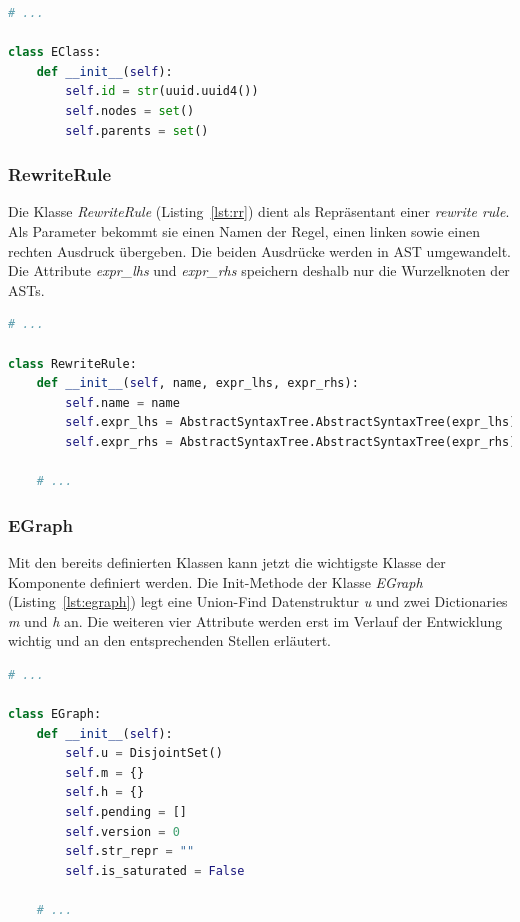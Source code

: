 \begin{lstlisting}[language=Python, caption=Klasse \textit{EClass}, label={lst:eclass}]
# ... 

class EClass:
    def __init__(self):
        self.id = str(uuid.uuid4())
        self.nodes = set()
        self.parents = set()
\end{lstlisting}

\subsubsection{RewriteRule}

Die Klasse \textit{RewriteRule} (Listing~\ref{lst:rr}) dient als Repräsentant einer \textit{rewrite rule}. Als Parameter bekommt sie einen Namen der Regel, einen linken sowie einen 
rechten Ausdruck übergeben. Die beiden Ausdrücke werden in AST umgewandelt. Die Attribute \textit{expr\_lhs} und \textit{expr\_rhs} speichern deshalb nur die Wurzelknoten der ASTs.

\begin{lstlisting}[language=Python, caption=Klasse \textit{RewriteRule}, label={lst:rr}]
# ... 

class RewriteRule:
    def __init__(self, name, expr_lhs, expr_rhs):
        self.name = name
        self.expr_lhs = AbstractSyntaxTree.AbstractSyntaxTree(expr_lhs)
        self.expr_rhs = AbstractSyntaxTree.AbstractSyntaxTree(expr_rhs)

    # ... 
\end{lstlisting}

\subsubsection{EGraph}

Mit den bereits definierten Klassen kann jetzt die wichtigste Klasse der Komponente definiert werden. Die Init-Methode der Klasse \textit{EGraph} (Listing~\ref{lst:egraph})
legt eine Union-Find Datenstruktur \textit{u} und zwei Dictionaries \textit{m} und \textit{h} an. Die weiteren vier Attribute werden erst im Verlauf der Entwicklung wichtig und 
an den entsprechenden Stellen erläutert.

\begin{lstlisting}[language=Python, caption=Auszug aus der Klasse \textit{EGraph}, label={lst:egraph}]
# ... 

class EGraph:
    def __init__(self):
        self.u = DisjointSet()
        self.m = {}
        self.h = {}
        self.pending = []
        self.version = 0
        self.str_repr = ""
        self.is_saturated = False

    # ...
\end{lstlisting} 



